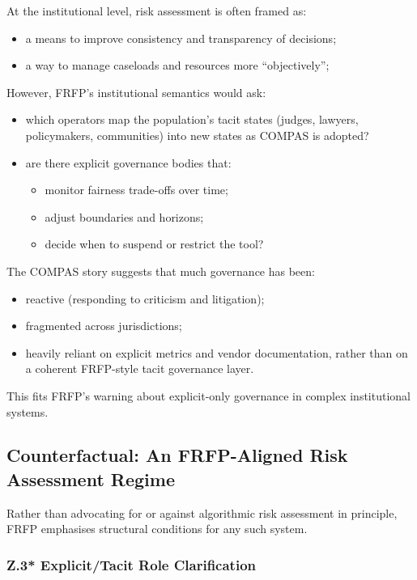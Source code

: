 At the institutional level, risk assessment is often framed as:

\begin{itemize}
  \item a means to improve consistency and transparency of decisions;
  \item a way to manage caseloads and resources more ``objectively'';
\end{itemize}

However, FRFP’s institutional semantics would ask:

\begin{itemize}
  \item which operators map the population’s tacit states (judges, lawyers,
        policymakers, communities) into new states as COMPAS is adopted?
  \item are there explicit governance bodies that:
        \begin{itemize}
          \item monitor fairness trade-offs over time;
          \item adjust boundaries and horizons;
          \item decide when to suspend or restrict the tool?
        \end{itemize}
\end{itemize}

The COMPAS story suggests that much governance has been:

\begin{itemize}
  \item reactive (responding to criticism and litigation);
  \item fragmented across jurisdictions;
  \item heavily reliant on explicit metrics and vendor documentation, rather
        than on a coherent FRFP-style tacit governance layer.
\end{itemize}

This fits FRFP’s warning about explicit-only governance in complex
institutional systems.

\subsection{Counterfactual: An FRFP-Aligned Risk Assessment Regime}

Rather than advocating for or against algorithmic risk assessment in
principle, FRFP emphasises structural conditions for any such system.

\subsubsection*{Z.3* Explicit/Tacit Role Clarification}

